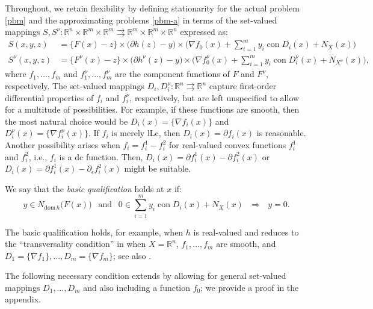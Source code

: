 \documentclass[smallextended,envcountsect]{svjour3}
\newcommand{\dom}[1]{\mathrm{dom}\, #1} %
\newcommand{\tto}{\rightrightarrows}
\newcommand{\reals}{\mathbb{R}}
\DeclareMathOperator{\con}{con}
\begin{document}
Throughout, we retain flexibility by defining stationarity for the actual problem \eqref{pbm} and the approximating problems \eqref{pbm-a} in terms of the set-valued mappings $S,S^\nu:\reals^n\times\reals^m\times\reals^m \tto  \reals^m \times \reals^m\times \reals^n$ expressed as:  
\begin{align}
S(x,y,z) & = \big\{F(x) - z\big\}  \times \big( \partial h(z)- y\big) \times  \Big( \nabla f_0(x) + \sum_{i=1}^m y_i \con D_i(x) + N_X(x)\Big)\label{eqn:S}\\
S^\nu(x,y,z) & = \big\{F^\nu(x) - z\big\}  \times \big( \partial h^\nu(z)- y\big) \times  \Big( \nabla f_0^\nu(x) + \sum_{i=1}^m y_i \con D_i^\nu(x) + N_{X^\nu}(x)\Big),\label{eqn:Snu}
\end{align}
where $f_1, \dots, f_m$ and $f_1^\nu, \dots, f_m^\nu$ are the component functions of $F$ and $F^\nu$, respectively. The set-valued mappings $D_i,D^\nu_i:\reals^n\tto\reals^n$ capture first-order differential properties of $f_i$ and $f_i^\nu$, respectively, but are left unspecified to allow for a multitude of possibilities. For example, if these functions are smooth, then the most natural choice would be $D_i(x) = \{\nabla f_i(x)\}$ and $D_i^\nu(x) = \{\nabla f_i^\nu(x)\}$. If $f_i$ is merely lLc, then $D_i(x) = \partial f_i(x)$ is reasonable. Another possibility arises when $f_i = f_i^1 - f_i^2$ for real-valued convex functions $f_i^1$ and $f_i^2$, i.e., $f_i$ is a dc function. Then, $D_i(x) = \partial f_i^1(x) - \partial f_i^2(x)$ or $D_i(x) = \partial f_i^1(x) - \partial_\epsilon f_i^2(x)$ might be suitable.     

We say that the {\em basic qualification} holds at $x$ if: 
\begin{equation}\label{qualification}
y\in N_{\dom h}\big(F(x)\big) ~~ \mbox{ and }~ ~  0 \in \sum_{i=1}^m y_i \con D_i(x) + N_X(x)~~~\Longrightarrow~~~ y=0.
\end{equation}

The basic qualification holds, for example, when $h$ is real-valued and reduces to the ``transversality condition'' in \cite[equation (4.3)]{LewisWright.16} when $X=\reals^n$, $f_1, \dots, f_m$ are smooth, and $D_1 = \{\nabla f_1\}, \dots, D_m = \{\nabla f_m\}$; see also \cite[Example 10.8]{Rockafellar_Wets_1998}. 

The following necessary condition extends \cite{Royset2023a} by allowing for general set-valued mappings $D_1, \dots, D_m$ and also including a function $f_0$; we provide a proof in the appendix. 
\end{document}
